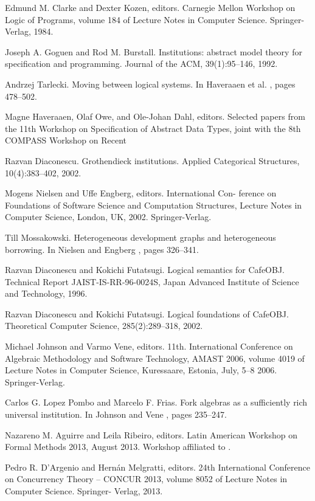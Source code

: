 \begin{thebibliography}{tesis}
 Edmund M. Clarke and Dexter Kozen, editors. Carnegie Mellon Workshop on Logic of Programs, volume 184 of Lecture Notes in Computer Science. Springer-Verlag, 1984. 

 Joseph A. Goguen and Rod M. Burstall. Institutions: abstract model theory for specification and programming. Journal of the ACM, 39(1):95–146, 1992. 

 Andrzej Tarlecki. Moving between logical systems. In Haveraaen et al. \cite{HOD96}, pages 478–502.

 Magne Haveraaen, Olaf Owe, and Ole-Johan Dahl, editors. Selected papers from the 11th Workshop on Specification of Abstract Data Types, joint with the 8th COMPASS Workshop on Recent

 Razvan Diaconescu. Grothendieck institutions. Applied Categorical Structures, 10(4):383–402, 2002.

 Mogens Nielsen and Uffe Engberg, editors. International Con- ference on Foundations of Software Science and Computation Structures, Lecture Notes in Computer Science, London, UK, 2002. Springer-Verlag.

 Till Mossakowski. Heterogeneous development graphs and heterogeneous borrowing. In Nielsen and Engberg \cite{NE02}, pages 326–341. 

 Razvan Diaconescu and Kokichi Futatsugi. Logical semantics for CafeOBJ. Technical Report JAIST-IS-RR-96-0024S, Japan Advanced Institute of Science and Technology, 1996. 

 Razvan Diaconescu and Kokichi Futatsugi. Logical foundations of CafeOBJ. Theoretical Computer Science, 285(2):289–318, 2002. 

  Michael Johnson and Varmo Vene, editors. 11th. International Conference on Algebraic Methodology and Software Technology, AMAST 2006, volume 4019 of Lecture Notes in Computer Science, Kuressaare, Estonia, July, 5–8 2006. Springer-Verlag. 

 Carlos G. Lopez Pombo and Marcelo F. Frias. Fork algebras as a sufficiently rich universal institution. In Johnson and Vene \cite{JV06}, pages 235–247. 

 Nazareno M. Aguirre and Leila Ribeiro, editors. Latin American Workshop on Formal Methods 2013, August 2013. Workshop affiliated to \cite{DM13}. 

 Pedro R. D’Argenio and Hernán Melgratti, editors. 24th International Conference on Concurrency Theory – CONCUR 2013, volume 8052 of Lecture Notes in Computer Science. Springer- Verlag, 2013.


\end{thebibliography}

